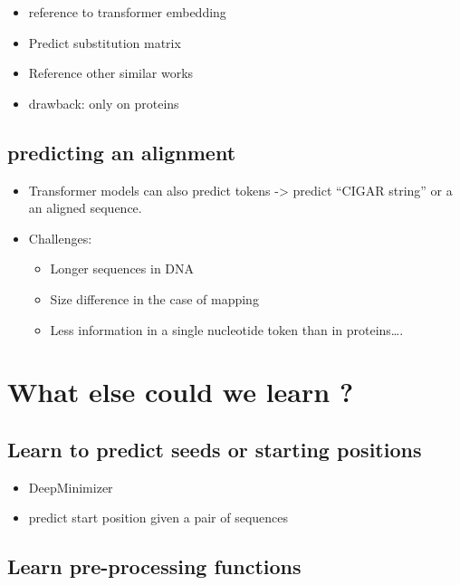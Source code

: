 \documentclass[
  11pt,
  twoside,
  BCOR=10mm,
  listof=totoc]{scrbook}
\begin{document}
\begin{itemize}
\item
  reference to transformer embedding
\item
  Predict substitution matrix
\item
  Reference other similar works
\item
  drawback: only on proteins
\end{itemize}

\hypertarget{predicting-an-alignment}{%
\subsection{predicting an alignment}\label{predicting-an-alignment}}

\begin{itemize}
\item
  Transformer models can also predict tokens -\textgreater{} predict ``CIGAR string'' or a an aligned sequence.
\item
  Challenges:

  \begin{itemize}
  \item
    Longer sequences in DNA
  \item
    Size difference in the case of mapping
  \item
    Less information in a single nucleotide token than in proteins\ldots.
  \end{itemize}
\end{itemize}

\hypertarget{what-else-could-we-learn}{%
\section{What else could we learn ?}\label{what-else-could-we-learn}}

\hypertarget{learn-to-predict-seeds-or-starting-positions}{%
\subsection{Learn to predict seeds or starting positions}\label{learn-to-predict-seeds-or-starting-positions}}

\begin{itemize}
\item
  DeepMinimizer
\item
  predict start position given a pair of sequences
\end{itemize}

\hypertarget{learn-pre-processing-functions}{%
\subsection{Learn pre-processing functions}\label{learn-pre-processing-functions}}
\end{document}
